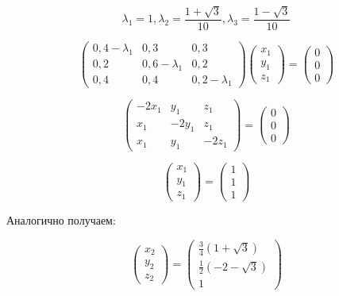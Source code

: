 \documentclass[a4paper,12pt]{article} %
\begin{document}
\begin{example}
$$
\lambda_{1}=1, \lambda_{2}=\frac{1+\sqrt{3}}{10}, \lambda_{3}=\frac{1-\sqrt{3}}{10}
$$



$$
\left(\begin{array}{ccc}
0,4-\lambda_{1} & 0,3 & 0,3 \\
0,2 & 0,6-\lambda_{1} & 0,2 \\
0,4 & 0,4 & 0,2-\lambda_{1}
\end{array}\right)\left(\begin{array}{l}
x_{1} \\
y_{1} \\
z_{1}
\end{array}\right)=\left(\begin{array}{l}
0 \\
0 \\
0
\end{array}\right) 
$$


\[ 
\left(\begin{array}{ccc}
	-2 x_{1} & y_{1} & z_{1} \\
	x_{1} & -2 y_{1} & z_{1} \\
	x_{1} & y_{1} & -2 z_{1}
\end{array}\right)=\left(\begin{array}{l}
	0 \\
	0 \\
	0
\end{array}\right)  
\]


\[ 
\left(\begin{array}{l}
	x_{1} \\
	y_{1} \\
	z_{1}
\end{array}\right)
=
\left(\begin{array}{l}
	1 \\
	1 \\
	1
\end{array}\right) 
\]


Аналогично получаем:

$$
\left(\begin{array}{l}
x_{2} \\
y_{2} \\
z_{2}
\end{array}\right)=\left(\begin{array}{c}
\frac{3}{4}(1+\sqrt{3}) \\
\frac{1}{2}(-2-\sqrt{3}) \\
1
\end{array}\right)
$$


\end{example}
\end{document}
